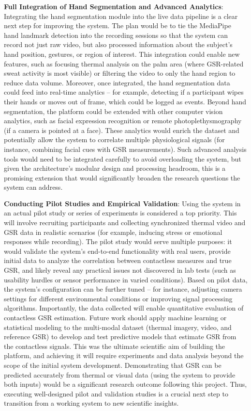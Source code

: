 \textbf{Full Integration of Hand Segmentation and Advanced Analytics}: Integrating the hand segmentation module into the live data pipeline is a clear next step for improving the system. The plan would be to tie the MediaPipe hand landmark detection into the recording sessions so that the system can record not just raw video, but also processed information about the subject's hand position, gestures, or region of interest. This integration could enable new features, such as focusing thermal analysis on the palm area (where GSR-related sweat activity is most visible) or filtering the video to only the hand region to reduce data volume. Moreover, once integrated, the hand segmentation data could feed into real-time analytics -- for example, detecting if a participant wipes their hands or moves out of frame, which could be logged as events. Beyond hand segmentation, the platform could be extended with other computer vision analytics, such as facial expression recognition or remote photoplethysmography (if a camera is pointed at a face). These analytics would enrich the dataset and potentially allow the system to correlate multiple physiological signals (for instance, combining facial cues with GSR measurements). Such advanced analysis tools would need to be integrated carefully to avoid overloading the system, but given the architecture's modular design and processing headroom, this is a promising extension that would significantly broaden the research questions the system can address.

\textbf{Conducting Pilot Studies and Empirical Validation}: Using the system in an actual pilot study or series of experiments is considered a top priority. This will involve recruiting participants and collecting synchronized thermal video and GSR data in realistic scenarios (for example, inducing stress or emotional responses while recording). The pilot study would serve multiple purposes: it would validate the system's end-to-end functionality with real users, provide initial data to analyze the correlation between contactless measures and true GSR, and likely reveal any practical issues not discovered in lab tests (such as usability hurdles or sensor performance in varied conditions). Based on pilot data, the system's configuration can be further tuned -- for instance, adjusting camera settings for different environmental conditions or improving signal processing algorithms. Importantly, the data collected will enable quantitative evaluation of contactless GSR estimation. Future work should apply machine learning or statistical modeling to the multi-modal dataset (thermal imagery, video, and reference GSR) to develop and test predictive models that estimate GSR from the contactless signals. This was the ultimate scientific aim of building the platform, and achieving it will require experiments and data analysis beyond the scope of the initial system development. Demonstrating that GSR can be predicted accurately from thermal or visual data (using the system to provide both inputs) would be a significant research outcome following this project. Thus, executing well-designed pilot and validation studies is a crucial next step to transition from a working system to new scientific insights.

